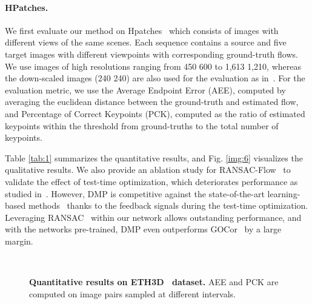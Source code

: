 \documentclass[10pt,twocolumn,letterpaper]{article}
\newcommand{\figref}[1]{Fig. \ref{#1}}
\newcommand{\tabref}[1]{Table \ref{#1}}
\begin{document}
\paragraph{HPatches.}
We first evaluate our method on Hpatches~\cite{balntas2017hpatches} which consists of images with different views of the same scenes. Each sequence contains a source and five target images with different viewpoints with corresponding ground-truth flows. We use images of high resolutions ranging from 450  600 to 1,613  1,210, whereas the down-scaled images (240  240) are also used for the evaluation as in~\cite{melekhov2019dgc}. For the evaluation metric, we use the Average Endpoint Error (AEE), computed by averaging the euclidean distance between the ground-truth and estimated flow, and Percentage of Correct Keypoints (PCK), computed as the ratio of estimated keypoints within the threshold from ground-truths to the total number of keypoints.

\tabref{tab:1} summarizes the quantitative results, and \figref{img:6} visualizes the qualitative results. We also provide an ablation study for RANSAC-Flow~\cite{shen2020ransac} to validate the effect of test-time optimization, which deteriorates performance as studied in~\cite{shen2020ransac}. However, DMP is competitive against the state-of-the-art learning-based methods~\cite{melekhov2019dgc,truong2020glu,shen2020ransac} thanks to the feedback signals during the test-time optimization. Leveraging RANSAC~\cite{fischler1981random} within our network allows outstanding performance, and with the networks pre-trained, DMP even outperforms GOCor~\cite{truong2020gocor} by a large margin. 
\vspace{-10pt}
\begin{figure}
	\centering
	\renewcommand{\thesubfigure}{}
	\hfill
	\hfill\\
    \caption{\textbf{Quantitative results on ETH3D~\cite{schops2017multi} dataset.} AEE and PCK are computed on image pairs sampled at different intervals.}
\label{ETH3d}\vspace{-5pt}\label{img:8}
\end{figure}
\end{document}
